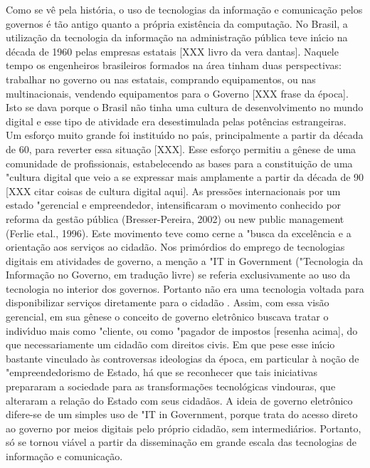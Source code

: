 \documentclass[
12pt,		%
openright,	%
twoside,  %
a4paper,			%
chapter=TITLE,		%
english,			%
french,				%
spanish,			%
brazil				%
]{USPSC-classe/USPSC}
\begin{document}
Como se v\^e pela hist\'oria, o uso de tecnologias da informa\c{c}\~ao e comunica\c{c}\~ao pelos governos \'e t\~ao antigo quanto a pr\'opria exist\^encia da computa\c{c}\~ao.
No Brasil, a utiliza\c{c}\~ao da tecnologia da informa\c{c}\~ao na administra\c{c}\~ao p\'ublica teve in\'{\i}cio na d\'ecada de 1960 pelas empresas estatais [XXX livro da vera dantas]. Naquele tempo os engenheiros brasileiros formados na \'area tinham duas perspectivas: trabalhar no governo ou nas estatais, comprando equipamentos, ou nas multinacionais, vendendo equipamentos para o Governo [XXX frase da \'epoca]. Isto se dava porque o Brasil n\~ao tinha uma cultura de desenvolvimento no mundo digital e esse tipo de atividade era desestimulada pelas pot\^encias estrangeiras. Um esfor\c{c}o muito grande foi institu\'{\i}do no pa\'{\i}s, principalmente a partir da d\'ecada de 60, para reverter essa situa\c{c}\~ao [XXX]. Esse esfor\c{c}o permitiu a g\^enese de uma comunidade de profissionais, estabelecendo as bases para a constitui\c{c}\~ao de uma "cultura digital que veio a se expressar mais amplamente a partir da d\'ecada de 90 [XXX citar coisas de cultura digital aqui].
As press\~oes internacionais por um estado "gerencial e empreendedor, intensificaram o movimento conhecido por reforma da gest\~ao p\'ublica (Bresser-Pereira, 2002) ou new public management (Ferlie etal., 1996). Este movimento teve como cerne a "busca da excel\^encia e a orienta\c{c}\~ao aos servi\c{c}os ao cidad\~ao.
Nos prim\'ordios do emprego de tecnologias digitais em atividades de governo, a men\c{c}\~ao a "IT in Government ("Tecnologia da Informa\c{c}\~ao no Governo, em tradu\c{c}\~ao livre) se referia exclusivamente ao uso da tecnologia no interior dos governos. Portanto n\~ao era uma tecnologia voltada para disponibilizar servi\c{c}os diretamente para o cidad\~ao .
Assim, com essa vis\~ao gerencial, em sua g\^enese o conceito de governo eletr\^onico buscava tratar o indiv\'{\i}duo mais como "cliente, ou como "pagador de impostos [resenha acima], do que necessariamente um cidad\~ao com direitos civis.
Em que pese esse in\'{\i}cio bastante vinculado \`as controversas ideologias da \'epoca, em particular \`a no\c{c}\~ao de "empreendedorismo de Estado, h\'a que se reconhecer que tais iniciativas prepararam a sociedade para as transforma\c{c}\~oes tecnol\'ogicas vindouras, que alteraram a rela\c{c}\~ao do Estado com seus cidad\~aos.
A ideia de governo eletr\^onico difere-se de um simples uso de "IT in Government, porque trata do acesso direto ao governo por meios digitais pelo pr\'oprio cidad\~ao, sem intermedi\'arios. Portanto, s\'o se tornou vi\'avel a partir da dissemina\c{c}\~ao em grande escala das tecnologias de informa\c{c}\~ao e comunica\c{c}\~ao.
\end{document}

